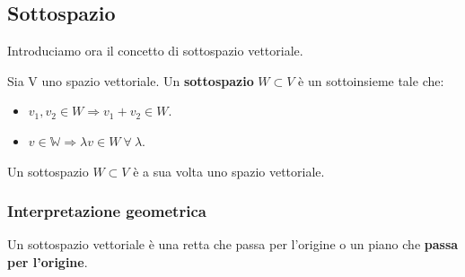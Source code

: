 \subsection{Sottospazio}
Introduciamo ora il concetto di sottospazio vettoriale.
\begin{definition}[Sottospazio]
Sia V uno spazio vettoriale. Un \textbf{sottospazio} $W \subset V$ è un sottoinsieme tale che:
\begin{itemize}
    \item $v_1, v_2 \in W \Longrightarrow v_1 + v_2 \in W$.
    \item $v \in \mathbb{W} \Longrightarrow \lambda v \in W \:\forall \: \lambda$.
\end{itemize}
\end{definition}

\begin{proposition}
Un sottospazio $W \subset V$ è a sua volta uno spazio vettoriale.
\end{proposition}

\subsubsection{Interpretazione geometrica}
Un sottospazio vettoriale è una retta che passa per l'origine o un piano che \textbf{passa per l'origine}. 

